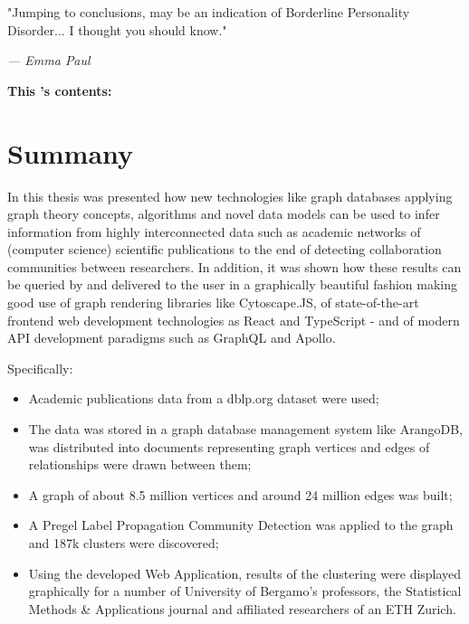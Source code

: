 \begin{figure}[H]%
		\label{fig:\chaptername\thechapter}%
\end{figure}

\vspace*{-3.55cm}
\epigraph{"Jumping to conclusions, may be an indication of Borderline Personality Disorder... I thought you should know."}{\textit{--- Emma Paul}}

\noindent \large{\textbf{This {\MakeLowercase{\chaptername}}'s contents:}}
\vspace*{-0.55cm}
\minitoc \mtcskip \minilof
\vspace*{-1.2cm}
\section{Summany} \label{section:Conclusions/Summany}
In this thesis was presented how new technologies like graph databases applying graph theory concepts, algorithms and novel data models can be used to infer information from highly interconnected data such as academic networks of (computer science) scientific publications to the end of detecting collaboration communities between researchers.
In addition, it was shown how these results can be queried by and delivered to the user in a graphically beautiful fashion making good use of graph rendering libraries like \gls{Cytoscape.JS}, of state-of-the-art frontend web development technologies as React and TypeScript - and of modern \acrshort{API} development paradigms such as \gls{GraphQL} and \gls{Apollo}.

Specifically:
 \begin{itemize}[noitemsep]
	\item Academic publications data from a \gls{dblp.org} dataset were used;
	\item The data was stored in a graph database management system like ArangoDB, was distributed into documents representing graph vertices and edges of relationships were drawn between them;
	\item A graph of about 8.5 million vertices and around 24 million edges was built;
	\item A \gls{Pregel} \gls{Label Propagation} Community Detection was applied to the graph and 187k clusters were discovered;
	\item Using the developed \gls{Web Application}, results of the clustering were displayed graphically for a number of University of Bergamo's professors, the Statistical Methods \& Applications journal and affiliated researchers of an ETH Zurich.
\end{itemize}
\bigskip

